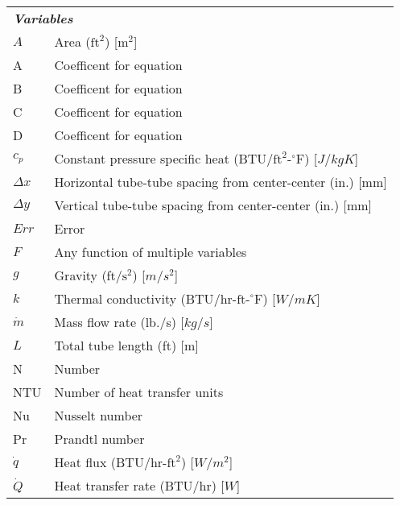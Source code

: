 \begin{nomenclature}
\begin{tabular}{p{2cm} p{12cm}}
		\multicolumn{2}{l}{\textbf{\textit{Variables}}} \\
		$A$ \dotfill & Area ($\mbox{ft}^2$) [m$^2$] \\
		A \dotfill & Coefficent for \cite{SteinhartHart1968} equation \\
		B \dotfill & Coefficent for \cite{SteinhartHart1968} equation \\
		C \dotfill & Coefficent for \cite{SteinhartHart1968} equation \\
		D \dotfill & Coefficent for \cite{SteinhartHart1968} equation \\
		$c_p$ \dotfill & Constant pressure specific heat ($\mbox{BTU}/\mbox{ft}^2 \mbox{-}^\circ$F) [$J/kg K$] \\
		$\Delta x$ \dotfill & Horizontal tube-tube spacing from center-center (in.) [mm] \\
		$\Delta y$ \dotfill & Vertical tube-tube spacing from center-center (in.) [mm] \\
		$Err$ \dotfill & Error \\
		$F$ \dotfill & Any function of multiple variables \\
		$g$ \dotfill & Gravity (ft/$\mbox{s}^2$) [$m/s^2$]\\
		$k$ \dotfill & Thermal conductivity ($\mbox{BTU}/\mbox{hr-ft-}^\circ$F) [$W/m K$] \\
		$\dot{m}$ \dotfill & Mass flow rate (lb./s) [$kg/s$] \\
		$L$ \dotfill & Total tube length (ft) [m] \\
		N \dotfill & Number \\
		NTU \dotfill & Number of heat transfer units \\
		Nu \dotfill & Nusselt number \\
		Pr \dotfill & Prandtl number \\
		$\dot{q}$ \dotfill & Heat flux ($\mbox{BTU}/\mbox{hr-ft}^2$) [$W/m^2$]\\
		$\dot{Q}$ \dotfill & Heat transfer rate (BTU/hr) [$W$]\\
		\end{tabular}
		

\end{nomenclature}
